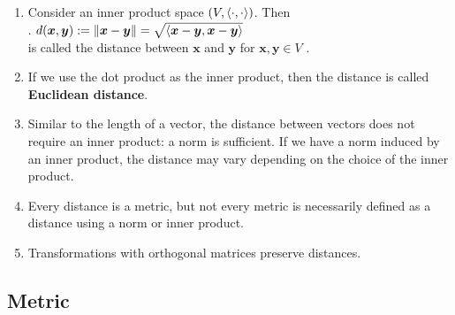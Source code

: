 \begin{enumerate}
    \item Consider an inner product space $(V,\langle\cdot, \cdot\rangle)$.
    Then
    \hfill \cite{mfml/book/mml/Deisenroth-Faisal-Ong}
    \\
    .\hfill
    $
        d(\bm{x}, \bm{y})
        := \left\| \bm{x} - \bm{y} \right\|
        = \sqrt{\langle\bm{x} - \bm{y}, \bm{x} - \bm{y}\rangle}
    $
    \hfill \cite{mfml/book/mml/Deisenroth-Faisal-Ong}
    \\
    is called the distance between $\bm{x}$ and $\bm{y}$ for $\bm{x}, \bm{y} \in V$ .
    \hfill \cite{mfml/book/mml/Deisenroth-Faisal-Ong}

    \item If we use the dot product as the inner product, then the distance is called \textbf{Euclidean distance}.
    \hfill \cite{mfml/book/mml/Deisenroth-Faisal-Ong}

    \item Similar to the length of a vector, the distance between vectors does not require an inner product: a norm is sufficient.
    If we have a norm induced by an inner product, the distance may vary depending on the choice of the inner product.
    \hfill \cite{mfml/book/mml/Deisenroth-Faisal-Ong}

    \item Every distance is a metric, but not every metric is necessarily defined as a distance using a norm or inner product.
    \hfill \cite{common/online/chatgpt}

    \item Transformations with orthogonal matrices preserve distances.
    \hfill \cite{mfml/book/mml/Deisenroth-Faisal-Ong}
\end{enumerate}




\subsection{Metric}

